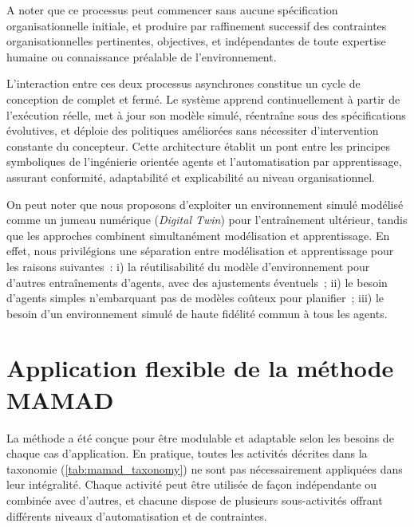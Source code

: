 A noter que ce processus peut commencer sans aucune spécification organisationnelle initiale, et produire par raffinement successif des contraintes organisationnelles pertinentes, objectives, et indépendantes de toute expertise humaine ou connaissance préalable de l'environnement.

\noindent L'interaction entre ces deux processus asynchrones constitue un cycle de conception de  complet et fermé. Le système apprend continuellement à partir de l'exécution réelle, met à jour son modèle simulé, réentraîne sous des spécifications évolutives, et déploie des politiques améliorées sans nécessiter d'intervention constante du concepteur. Cette architecture établit un pont entre les principes symboliques de l'ingénierie orientée agents et l'automatisation par apprentissage, assurant conformité, adaptabilité et explicabilité au niveau organisationnel.

\noindent On peut noter que nous proposons d'exploiter un environnement simulé modélisé comme un jumeau numérique (\textit{Digital Twin}) pour l'entraînement ultérieur, tandis que les approches  combinent simultanément modélisation et apprentissage. En effet, nous privilégions une séparation entre modélisation et apprentissage pour les raisons suivantes~: i) la réutilisabilité du modèle d'environnement pour d'autres entraînements d'agents, avec des ajustements éventuels~; \quad ii) le besoin d'agents simples n'embarquant pas de modèles coûteux pour planifier~; \quad iii) le besoin d'un environnement simulé de haute fidélité commun à tous les agents.

\section{Application flexible de la méthode MAMAD}
\label{subsec:mamad_flexible}



La méthode  a été conçue pour être modulable et adaptable selon les besoins de chaque cas d'application.
En pratique, toutes les activités décrites dans la taxonomie (\autoref{tab:mamad_taxonomy}) ne sont pas nécessairement appliquées dans leur intégralité.
Chaque activité peut être utilisée de façon indépendante ou combinée avec d'autres, et chacune dispose de plusieurs sous-activités offrant différents niveaux d'automatisation et de contraintes.

